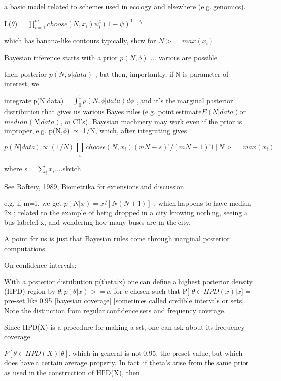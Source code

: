 \documentclass[11pt,a4paper]{article}
\begin{document}
	a basic model related to schemes used in ecology and elsewhere (e.g. genomics).
	
	L($\theta$) = $\prod_{i=1}^m choose(N,x_i) \psi^x_i   (1-\psi)^{1-x_i}$
	
	which has banana-like contours typically,  show for $N >= max(x_i)$
	
	Bayesian inference starts with a prior $p(N,\phi)$ ... various are possible
	
	then posterior $p(N,\phi|data)$ , but then, importantly, if N is parameter of interest, we
	
	integrate  p(N$|$data) = $\int_0^1 p(N,\phi|data) d\phi$  , and it's the marginal posterior distribution that gives us various Bayes rules (e.g. point estimate$ E(N|data) $or $median(N|data)$, or CI's).    Bayesian machinery may work even if the prior is improper, e.g. p(N,$\phi$) $\propto$ 1/N, which, after integrating gives
	
	\begin{equation}
	p(N|data) \propto (1/N) \prod_i  choose(N,x_i )   (mN -s )!/(mN+1)!  1[ N >= max(x_i) ]
	\end{equation}
	
	where s = $\sum_i x_i ... $.sketch
	
	See Raftery, 1989, Biometrika for extensions and discussion.
	
	e.g. if m=1, we get $p(N|x) = x/[ N(N+1) ]$  , which happens to have median 2x ; related to the example of being dropped in a city knowing nothing, seeing a bus labeled x, and wondering how many buses are in the city.
	
	A point for us is just that Bayesian rules come through marginal posterior computations.
	
	On confidence intervals:
	
	With a posterior distribution p(theta|x) one can define a highest posterior density (HPD) region by { $\theta: p(\theta|x) >= c $}, for c chosen such that P[ $\theta \in HPD(x) | x $] = pre-set like 0.95 [bayesian coverage] [sometimes called credible intervals or sets].  Note the distinction from regular confidence sets and frequency coverage.
	
	Since HPD(X) is a procedure for making a set, one can ask about its frequency coverage
	
	$P[ \theta \in HPD(X) | \theta ]$, which in general is not 0.95, the preset value, but which does have a certain average property.  In fact, if theta's arise from the same prior as used in the construction of HPD(X), then 
	
\end{document}

